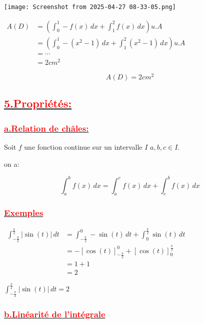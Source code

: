\documentclass[12pt]{article}
\begin{document}
\begin{center}
   \texttt{[image: Screenshot from 2025-04-27 08-33-05.png]}
\end{center}
\(
\begin{aligned}
A(D) &= \left( \int_0^1 -f(x) \, dx + \int_1^2 f(x) \, dx \right) u.A\\
		 &= \left( \int_0^1 -(x^{2}-1) \, dx + \int_1^2 (x^{2}-1) \, dx \right) u.A\\
		 &=\cdots\\
		 &=2cm^{2}
\end{aligned}
\)  

\[\boxed{A(D)=2cm^{2}}\]   
  
\subsection*{\underline{\textbf{\textcolor{red}{5.Propriétés:}}}}

\subsubsection*{\underline{\textbf{\textcolor{red}{a.Relation de châles:}}}}

Soit \( f \) une fonction continue sur un intervalle \( I \) \(a,b,c \in I \).

on a:

\[
\int_{a}^{b} f(x) \, dx = \int_{a}^{c} f(x) \, dx + \int_{c}^{b} f(x) \, dx
\]

\subsubsection*{\underline{\textbf{\textcolor{red}{Exemples}}}}

\(
\begin{aligned}
\int_{-\frac{\pi}{2}}^{\frac{\pi}{2}} \left| \sin(t) \right| \, dt &= \int_{-\frac{\pi}{2}}^{0} -\sin(t) \, dt + \int_{0}^{\frac{\pi}{2}} \sin(t) \, dt\\
&= -\left[\cos(t) \right]_{-\frac{\pi}{2}}^{0} + \left[ \cos(t) \right]_{0}^{\frac{\pi}{2}}\\
&=1+1\\
&=2
\end{aligned}
\)

\( \int_{-\frac{\pi}{2}}^{\frac{\pi}{2}} \left| \sin(t) \right| \, dt = 2 \)

\subsubsection*{\underline{\textbf{\textcolor{red}{b.Linéarité de l'intégrale}}}}
\end{document}
